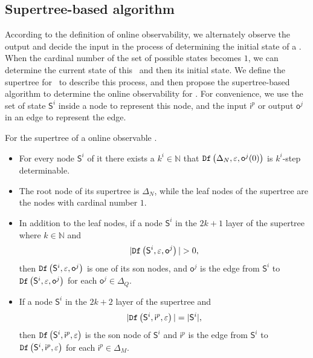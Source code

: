 \subsection{Supertree-based algorithm} %
According to the definition of online observability, we alternately observe the output and decide the input in the process of determining the initial state of a \BCN. When the  cardinal number of the set of possible states becomes $1$, we can determine the current state of this \BCN\ and then its initial state. We define the supertree for \BCNs\ to describe this process, and then propose the supertree-based algorithm to determine the online observability for \BCNs. For convenience, we use the set of state $\mathsf{S}^i$ inside a node to represent this node, and the input $\mathsf{i}^p$ or output $\mathsf{o}^j$ in an edge to represent the edge.
\begin{definition}[Supertree]
For the supertree of a online observable \BCN.   
\begin{itemize}
 \item  For every node $\mathsf{S}^i$ of it there exists a $k^{i}\in \mathbb{N}$ that ${\tt Df}\left(\Delta_N,\varepsilon,\mathsf{o}^{j}(0)\right)$ is $k^{i}$-step determinable.
 \item  The root node of its supertree is $\Delta_N$, while the leaf nodes of the supertree are the nodes with cardinal number $1$.%
 \item In addition to the leaf nodes, if a node $\mathsf{S}^i$ in the $2k + 1$ layer of the supertree where $k\in \mathbb{N}$ and 
\[|\Ded\left(\mathsf{S}^i,\varepsilon, \mathsf{o}^j\right)|>0,\]
 then ${\tt Df}\left(\mathsf{S}^i,\varepsilon, \mathsf{o}^j\right)$ is one of its son nodes, and $\mathsf{o}^j$ is the edge from $\mathsf{S}^i$ to ${\tt Df}\left(\mathsf{S}^i,\varepsilon, \mathsf{o}^j\right)$ for each $\mathsf{o}^j\in \Delta_Q$.
 \item  If a node $\mathsf{S}^i$ in the $2k+2$ layer of the supertree and  
\[|{\tt Df}\left(\mathsf{S}^i,\mathsf{i}^p,\varepsilon\right)|=|\mathsf{S}^i|,\] 
then ${\tt Df}\left(\mathsf{S}^i,\mathsf{i}^p,\varepsilon\right)$ is the son node of $\mathsf{S}^i$ and $\mathsf{i}^p$ is the edge from $\mathsf{S}^i$ to ${\tt Df}\left(\mathsf{S}^i,\mathsf{i}^p,\varepsilon\right)$ for each $\mathsf{i}^p \in \Delta_M$. 
 \end{itemize}
\label{def:super-tree}
\end{definition}

